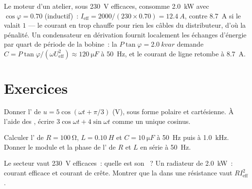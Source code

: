\begin{example}\label{ex:b1:sinusoidal-impedance:pf}
Le moteur d'un atelier, sous \qty{230}{V} efficaces, consomme
\qty{2.0}{kW} avec $\cos\varphi = 0.70$ (inductif)~: $I_{\mathrm{eff}} = 2000/(230 \times
0.70) = \qty{12.4}{A}$, contre \qty{8.7}{A} si le 
valait $1$ --- le courant en trop chauffe pour rien les câbles du
distributeur, d'où la pénalité. Un condensateur en dérivation fournit
localement les échanges d'énergie par quart de période de la bobine~: la
\emph{} $P\tan\varphi =
\qty{2.0}{kvar}$ demande $C = P\tan\varphi/(\omega U_{\mathrm{eff}}^2)
\approx \qty{120}{\micro F}$ à \qty{50}{Hz}, et le courant de ligne
retombe à \qty{8.7}{A}.
\end{example}

\section{Exercices}

\begin{exercise}[$\star$]\label{exo:b1:sinusoidal-impedance:1}
Donner l' de $u = 5\cos(\omega t + \pi/3)$ (V), sous
forme polaire et cartésienne. À l'aide des , écrire $3\cos\omega t
+ 4\sin\omega t$ comme un unique cosinus.
\end{exercise}

\begin{exercise}[$\star$]\label{exo:b1:sinusoidal-impedance:2}
Calculer l' de $R = \qty{100}{\ohm}$, $L = \qty{0.10}{H}$ et
$C = \qty{10}{\micro F}$ à \qty{50}{Hz} puis à \qty{1.0}{kHz}. Donner le
module et la phase de l' de $R$ et $L$ en série à
\qty{50}{Hz}.
\end{exercise}

\begin{exercise}[$\star$]\label{exo:b1:sinusoidal-impedance:3}
Le secteur vaut \qty{230}{V} efficaces~: quelle est son ~? Un
radiateur de \qty{2.0}{kW}~: courant efficace et courant de crête.
Montrer que la  dans une résistance vaut
$RI_{\mathrm{eff}}^2$.
\end{exercise}

